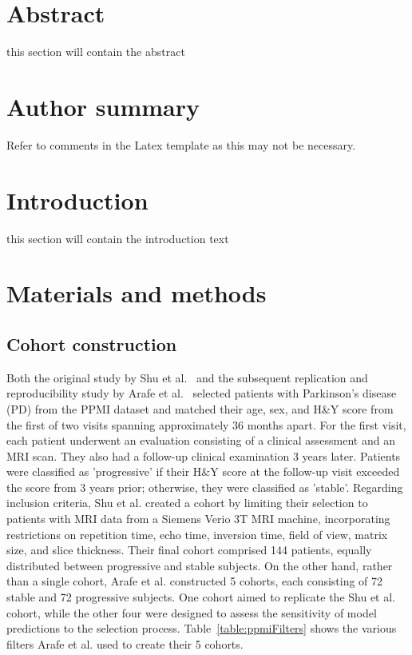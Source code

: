 \documentclass[10pt,letterpaper]{article}
\begin{document}
\section*{Abstract}
this section will contain the abstract

\section*{Author summary}
Refer to comments in the Latex template as this may not be necessary.

\linenumbers

\section*{Introduction}
this section will contain the introduction text

\section*{Materials and methods}
\subsection*{Cohort construction}

Both the original study by Shu et al.~\cite{shu2021predicting} and the subsequent replication and reproducibility study by 
Arafe et al.~\cite{Arafe2023.05.05.539590} selected patients with Parkinson's disease (PD) from the PPMI dataset and matched their 
age, sex, and H\&Y score from the first of two visits spanning approximately 36 months apart. For the first visit, each patient 
underwent an evaluation consisting of a clinical assessment and an MRI scan. They also had a follow-up clinical examination 3 years later. 
Patients were classified as 'progressive' if their H\&Y score at the follow-up visit exceeded the score from 3 years prior; otherwise, they 
were classified as 'stable'. Regarding inclusion criteria, Shu et al. created a cohort by limiting their selection to patients with MRI data 
from a Siemens Verio 3T MRI machine, incorporating restrictions on repetition time, echo time, inversion time, field of view, matrix size, 
and slice thickness. Their final cohort comprised 144 patients, equally distributed between progressive and stable subjects. 
On the other hand, rather than a single cohort, Arafe et al. constructed 5 cohorts, each consisting of 72 stable and 72 progressive subjects. One 
cohort aimed to replicate the Shu et al. cohort, while the other four were designed to assess the sensitivity of model predictions to 
the selection process. Table~\ref{table:ppmiFilters} shows the various filters Arafe et al. used to create their 5 cohorts. 
\end{document}
